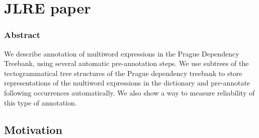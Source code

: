 \chapter{JLRE paper}

\subsection{Abstract}
We describe annotation of multiword expressions in the Prague Dependency Treebank, using several automatic pre-annotation steps.
We use subtrees of the tectogrammatical tree structures of the Prague dependency treebank to store representations of the multiword expressions in the dictionary and pre-annotate following occurrences automatically.
We also show a way to measure reliability of this type of annotation. 




\section{Motivation} 
\label{sec:motiv}

